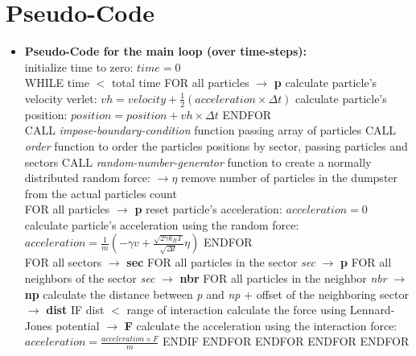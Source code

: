 \documentclass[a4paper,11pt]{article}
\newcommand\tab[1][4mm]{\hspace*{#1}}
\begin{document}
\section*{Pseudo-Code}
\begin{itemize}
\item\textbf{Pseudo-Code for the main loop (over time-steps):} \\
\bgroup\obeylines\small
initialize time to zero: $time = 0$ \\

WHILE time \(<\) total time
    \tab FOR all particles $\rightarrow$ \textbf{p}
        \tab\tab calculate particle's velocity verlet: $vh = velocity + \frac{1}{2} (acceleration \times \Delta t)$
        \tab\tab calculate particle's position: $position = position + vh \times \Delta t$
    \tab ENDFOR \\

    \tab CALL \emph{impose-boundary-condition} function passing array of particles
    \tab CALL \emph{order} function to order the particles positions by sector, passing particles and sectors
    \tab CALL \emph{random-number-generator} function to create a normally distributed random force: $\rightarrow \eta$
    \tab remove number of particles in the dumpster from the actual particles count \\

    \tab FOR all particles $\rightarrow$ \textbf{p}
    \tab\tab reset particle's acceleration: $acceleration = 0$
    \tab\tab calculate particle's acceleration using the random force: $ acceleration = \frac{1}{m}(-\gamma v + \frac{\sqrt{2\gamma k_B T}}{\sqrt{\Delta t}}\eta) $
    \tab ENDFOR \\

    \tab FOR all sectors $\rightarrow$ \textbf{sec}
        \tab\tab FOR all particles in the sector \emph{sec} $\rightarrow$ \textbf{p}
            \tab\tab\tab FOR all neighbors of the sector \emph{sec} $\rightarrow$ \textbf{nbr}
                \tab\tab\tab\tab FOR all particles in the neighbor \emph{nbr} $\rightarrow$ \textbf{np}
                    \tab\tab\tab\tab\tab calculate the distance between \emph{p} and \emph{np} + offset of the neighboring sector $\rightarrow$ \textbf{dist}
                    \tab\tab\tab\tab\tab IF dist $<$ range of interaction
                        \tab\tab\tab\tab\tab\tab calculate the force using Lennard-Jones potential \cite{lj} $\rightarrow$ \textbf{F}
                        \tab\tab\tab\tab\tab\tab calculate the acceleration using the interaction force: $acceleration = \frac{acceleration \times F}{m}$
                    \tab\tab\tab\tab\tab ENDIF
                \tab\tab\tab\tab ENDFOR
            \tab\tab\tab ENDFOR
        \tab\tab ENDFOR
    \tab ENDFOR \\


\end{itemize}
\end{document}
